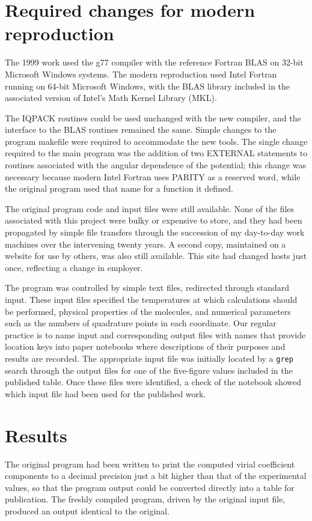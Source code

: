 \section{Required changes for modern reproduction}
The 1999 work used the g77 compiler with the reference Fortran BLAS on 32-bit Microsoft Windows systems.  The modern reproduction used Intel Fortran running on 64-bit Microsoft Windows, with the BLAS library included in the associated version of Intel's Math Kernel Library (MKL).

The IQPACK routines could be used unchanged with the new compiler, and the interface to the BLAS routines remained the same.  Simple changes to the program makefile were required to accommodate the new tools.  The single change required to the main program was the addition of two EXTERNAL statements to routines associated with the angular dependence of the potential; this change was necessary because modern Intel Fortran uses PARITY as a reserved word, while the original program used that name for a function it defined.

The original program code and input files were still available.  None of the files associated with this project were bulky or expensive to store, and they had been propagated by simple file transfers through the succession of my day-to-day work machines over the intervening twenty years.  A second copy, maintained on a website for use by others, was also still available. This site had changed hosts just once, reflecting a change in employer.

The program was controlled by simple text files, redirected through standard input.  These input files specified the temperatures at which calculations should be performed, physical properties of the molecules, and numerical parameters such as the numbers of quadrature points in each coordinate.  Our regular practice is to name input and corresponding output files with names that provide location keys into paper notebooks where descriptions of their purposes and results are recorded.  The appropriate input file was initially located by a \texttt{grep} search through the output files for one of the five-figure values included in the published table.  Once these files were identified, a check of the notebook showed which input file had been used for the published work.



\section{Results}
The original program had been written to print the computed virial coefficient components to a decimal precision just a bit higher than that of the experimental values, so that the program output could be converted directly into a table for publication.  The freshly compiled program, driven by the original input file, produced an output identical to the original.

